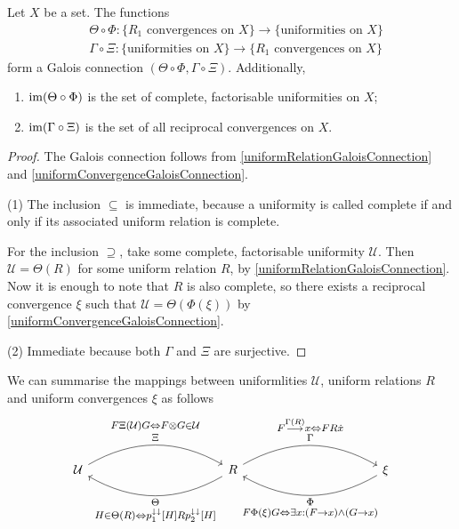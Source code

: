 \begin{corollary}
Let $X$ be a set. The functions
\begin{align*}
&\Theta \circ \Phi: \{\text{$R_1$ convergences on $X$}\} \to \{\text{uniformities on $X$}\} \\
&\Gamma\circ \Xi: \{\text{uniformities on $X$}\} \to \{\text{$R_1$ convergences on $X$}\}
\end{align*}
form a Galois connection $(\Theta \circ \Phi, \Gamma\circ \Xi)$. Additionally,
\begin{enumerate}
\item $\operatorname{im}(\Theta \circ \Phi)$ is the set of complete, factorisable uniformities on $X$;
\item $\operatorname{im}(\Gamma\circ \Xi)$ is the set of all reciprocal convergences on $X$.
\end{enumerate}
\end{corollary}
\begin{proof}
The Galois connection follows from \ref{uniformRelationGaloisConnection} and \ref{uniformConvergenceGaloisConnection}.

(1) The inclusion $\subseteq$ is immediate, because a uniformity is called complete if and only if its associated uniform relation is complete.

For the inclusion $\supseteq$, take some complete, factorisable uniformity $\mathcal{U}$. Then $\mathcal{U} = \Theta(R)$ for some uniform relation $R$, by \ref{uniformRelationGaloisConnection}. Now it is enough to note that $R$ is also complete, so there exists a reciprocal convergence $\xi$ such that $\mathcal{U} = \Theta(\Phi(\xi))$ by \ref{uniformConvergenceGaloisConnection}.

(2) Immediate because both $\Gamma$ and $\Xi$ are surjective.
\end{proof}

We can summarise the mappings between uniformlities $\mathcal{U}$, uniform relations $R$ and uniform convergences $\xi$ as follows
\[ \begin{tikzcd}[labels = {font=\large}, column sep=large]
\mathcal{U} \arrow[bend left, rrr, "\substack{F\mathrel{\Xi(\mathcal{U})}G \Leftrightarrow F\otimes G\in \mathcal{U} \vspace{0.1em} \\ \vspace{0.1em} \Xi}"] &&& \arrow[lll, bend left, "\substack{\Theta \vspace{0.1em} \\ H\in\Theta(R) \Leftrightarrow p_1^{\imf\imf}[H]\mathrel{R}p_2^{\imf\imf}[H]}"] R \arrow[rrr, bend left, "\substack{F\overset{\Gamma(R)}{\longrightarrow} x \Leftrightarrow F\mathrel{R}\pfilter{x} \vspace{0.1em} \\ \vspace{0.1em} \Gamma}"] &&& \arrow[lll, bend left, "\substack{\Phi \vspace{0.1em} \\ F\mathrel{\Phi(\xi)}G \Leftrightarrow \exists x: (F\to x)\land (G\to x)}"] \xi
\end{tikzcd} \]

